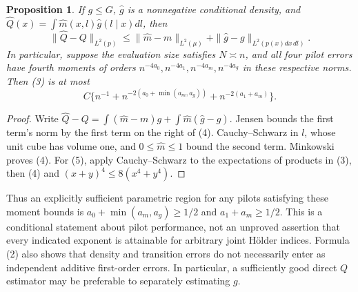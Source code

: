 \documentclass[11pt]{article}
\newtheorem{proposition}[theorem]{Proposition}
\theoremstyle{definition}
\begin{document}
\begin{proposition}
If $g\le G$, $\widehat g$ is a nonnegative conditional density, and
$\widehat Q(x)=\int\widehat m(x,l)\widehat g(l\mid x)dl$, then
\[
 \|\widehat Q-Q\|_{L^2(p)}
 \le \|\widehat m-m\|_{L^2(\mu)}
       +\|\widehat g-g\|_{L^2(p(x)dx\,dl)}.              \tag{4}
\]
In particular, suppose the evaluation size satisfies $N\asymp n$, and
all four pilot errors have fourth moments of orders
$n^{-4a_0},n^{-4a_1},n^{-4a_m},n^{-4a_g}$ in these respective norms.
Then (3) is at most
\[
 C\{n^{-1}+n^{-2(a_0+\min(a_m,a_g))}
             +n^{-2(a_1+a_m)}\}.                        \tag{5}
\]
\end{proposition}
\begin{proof}
Write $\widehat Q-Q=\int(\widehat m-m)g+
\int\widehat m(\widehat g-g)$. Jensen bounds the first term's norm by
the first term on the right of (4). Cauchy--Schwarz in $l$, whose unit
cube has volume one, and $0\le\widehat m\le1$ bound the second term.
Minkowski proves (4). For (5), apply Cauchy--Schwarz to the expectations
of products in (3), then (4) and $(x+y)^4\le8(x^4+y^4)$.
\end{proof}
Thus an explicitly sufficient parametric region for any pilots satisfying
these moment bounds is $a_0+\min(a_m,a_g)\ge1/2$ and
$a_1+a_m\ge1/2$. This is a conditional statement about pilot performance,
not an unproved assertion that every indicated exponent is attainable
for arbitrary joint H\"older indices. Formula (2) also shows that density
and transition errors do not necessarily enter as independent additive
first-order errors. In particular, a sufficiently good direct $Q$ estimator
may be preferable to separately estimating $g$.
\end{document}
